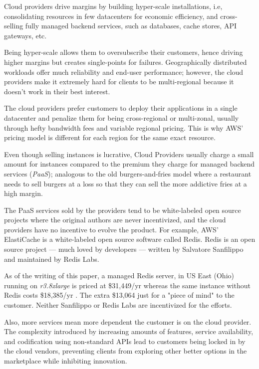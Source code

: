 \documentclass[11pt,english]{article}
\theoremstyle{definition}
\begin{document}
Cloud providers drive margins by building hyper-scale installations, i.e, consolidating resources in few datacenters for economic efficiency, and cross-selling fully managed backend services, such as databases, cache stores, API gateways, etc.

Being hyper-scale allows them to oversubscribe their customers, hence driving higher margins but creates single-points for failures. Geographically distributed workloads offer much reliability and end-user performance; however, the cloud providers make it extremely hard for clients to be multi-regional because it doesn't work in their best interest.

The cloud providers prefer customers to deploy their applications in a single datacenter and penalize them for being cross-regional or multi-zonal, usually through hefty bandwidth fees and variable regional pricing. This is why AWS' pricing model is different for each region for the same exact resource.

Even though selling instances is lucrative, Cloud Providers usually charge a small amount for instances compared to the premium they charge for managed backend services (\textit{PaaS}); analogous to the old burgers-and-fries model where a restaurant needs to sell burgers at a loss so that they can sell the more addictive fries at a high margin. 

The PaaS services sold by the providers tend to be white-labeled open source projects where the original authors are never incentivized, and the cloud providers have no incentive to evolve the product. For example, AWS' ElastiCache is a white-labeled open source software called Redis. Redis is an open source project --- much loved by developers --- written by Salvatore Sanfilippo and maintained by Redis Labs.

As of the writing of this paper, a managed Redis server, in US East (Ohio) running on \textit{r3.8xlarge} is priced at \$31,449/yr \cite{AECPRICING} whereas the same instance without Redis costs \$18,385/yr \cite{EC2PRICING}. The extra \$13,064 just for a "piece of mind" to the customer. Neither Sanfilippo or Redis Labs are incentivized for the efforts. 

Also, more services mean more dependent the customer is on the cloud provider. The complexity introduced by increasing amounts of features, service availability, and codification using non-standard APIs lead to customers being locked in by the cloud vendors, preventing clients from exploring other better options in the marketplace while inhibiting innovation.
\end{document}
